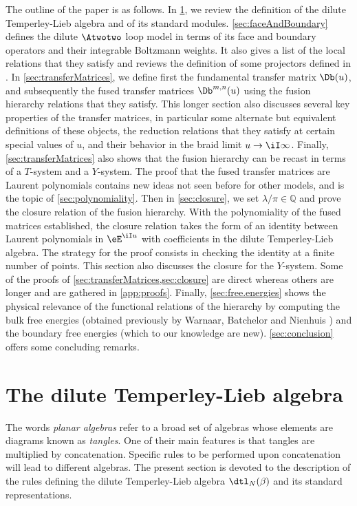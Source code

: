 \documentclass[11pt]{article}
\numberwithin{equation}{section}
\theoremstyle{alexi}
\begin{document}
The outline of the paper is as follows. In \cref{sec:dTL_N}, we review the definition of the dilute Temperley-Lieb algebra and of its standard modules. \cref{sec:faceAndBoundary} defines the dilute $\Atwotwo$ loop model in terms of its face and boundary operators and their integrable Boltzmann weights. It also gives a list of the local relations that they satisfy and reviews the definition of some projectors defined in \cite{AMDPP19}. In \cref{sec:transferMatrices}, we define first the fundamental transfer matrix $\Db(u)$, and subsequently the fused transfer matrices $\Db^{m,n}(u)$ using the fusion hierarchy relations that they satisfy. This longer section also discusses several key properties of the transfer matrices, in particular some alternate but equivalent definitions of these objects, the reduction relations that they satisfy at certain special values of $u$, and their behavior in the braid limit $u\to \iI \infty$. Finally, \cref{sec:transferMatrices} also shows that the fusion hierarchy can be recast in terms of a $T$-system and a $Y$-system. The proof that the fused transfer matrices are Laurent polynomials contains new ideas not seen before for other models, and is the topic of \cref{sec:polynomiality}. Then in \cref{sec:closure}, we set $\lambda/\pi \in \mathbb Q$ and prove the closure relation of the fusion hierarchy. With the polynomiality of the fused matrices established, the closure relation takes the form of an identity between Laurent polynomials in $\eE^{\iI u}$ with coefficients in the dilute Temperley-Lieb algebra. The strategy for the proof consists in checking the identity at a finite number of points. This section also discusses the closure for the $Y$-system. Some of the proofs of \cref{sec:transferMatrices,sec:closure} are direct whereas others are longer and are gathered in \cref{app:proofs}. Finally, \cref{sec:free.energies} shows the physical relevance of the functional relations of the hierarchy by computing the bulk free energies (obtained previously by Warnaar, Batchelor and Nienhuis \cite{WBN92}) and the boundary free energies (which to our knowledge are new). \cref{sec:conclusion} offers some concluding remarks.

%
\section{The dilute Temperley-Lieb algebra} \label{sec:dTL_N}
%

The words \textit{planar algebras} \cite{VFRJ99} refer to a broad set of algebras whose elements are diagrams known as \textit{tangles}. One of their main features is that tangles are multiplied by concatenation. Specific rules to be performed upon concatenation will lead to different algebras. The present section is devoted to the description of the rules defining the dilute Temperley-Lieb algebra $\dtl_N(\beta)$ and its standard representations.
\end{document}
